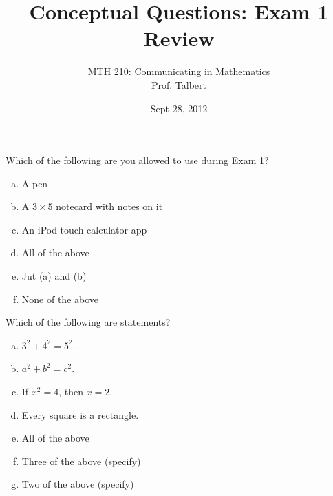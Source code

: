 \documentclass[palatino]{beamer}
\title[Exam 1 Review] 
{Conceptual Questions: Exam 1 Review}
\author[MTH 210 -- Talbert]{MTH 210: Communicating in Mathematics \\ Prof. Talbert}
\date{Sept 28, 2012}
\begin{document}
	
	\begin{frame}
	  \titlepage
	\end{frame}

	
% 	
% 	

\begin{frame}
Which of the following are you allowed to use during Exam 1?
\begin{enumerate}[(a)]
	\item A pen
	\item A $3 \times 5$ notecard with notes on it
	\item An iPod touch calculator app
	\item All of the above
	\item Jut (a) and (b)
	\item None of the above
\end{enumerate}
\end{frame}

\begin{frame}
Which of the following are statements? 
\begin{enumerate}[(a)]
	\item $3^2 + 4^2 = 5^2$. 
	\item $a^2 + b^2 = c^2$. 
	\item If $x^2 = 4$, then $x = 2$. 
	\item Every square is a rectangle. 
	\item All of the above
	\item Three of the above (specify)
	\item Two of the above (specify)
\end{enumerate}
\end{frame}
\end{document}
